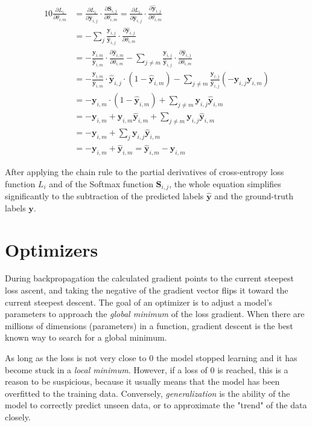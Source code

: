 \documentclass[a4paper]{report}
\newcommand{\matr}[1]{\mathbf{#1}}
\newcommand{\vect}[1]{\bm{#1}}
\newcommand{\yij}{\vect{y}_{i,j}}
\newcommand{\yhatij}{\vect{\hat{y}}_{i,j}}
\begin{document}
\begin{alignat*}{10}
    \frac{\partial L_i}{\partial \theta_{i,m}} &= \frac{\partial L_i}{\partial \yhatij} \cdot \frac{\partial \matr{S}_{i,j}}{\partial \theta_{i,m}} = \frac{\partial L_i}{\partial \yhatij} \cdot \frac{\partial \yhatij}{\partial \theta_{i,m}} \\
    &= -\sum_{j}\frac{\yij}{\yhatij} \cdot \frac{\partial \yhatij}{\partial \theta_{i,m}} \\
    &= -\frac{\vect{y}_{i,m}}{\vect{\hat{y}}_{i,m}} \cdot \frac{\partial \vect{\hat{y}}_{i,m}}{\partial \theta_{i,m}} - \sum_{j\not=m}\frac{\yij}{\yhatij} \cdot \frac{\partial\yhatij}{\partial\theta_{i,m}} \\
    &= -\frac{\vect{y}_{i,m}}{\vect{\hat{y}}_{i,m}} \cdot \yhatij \cdot (1 - \vect{\hat{y}}_{i,m}) - \sum_{j\not=m}\frac{\yij}{\yhatij}(-\yij\vect{y}_{i,m}) \\
    &= -\vect{y}_{i,m} \cdot (1 - \vect{\hat{y}}_{i,m}) + \sum_{j\not=m}\yij\vect{\hat{y}}_{i,m} \\
    &= -\vect{y}_{i,m} + \vect{y}_{i,m} \vect{\hat{y}}_{i,m} + \sum_{j\not=m}\yij\vect{\hat{y}}_{i,m} \\
    &= -\vect{y}_{i,m} + \sum_{j}\yij\vect{\hat{y}}_{i,m} \\
    &= -\vect{y}_{i,m} + \vect{\hat{y}}_{i,m} = \vect{\hat{y}}_{i,m} - \vect{y}_{i,m}
\end{alignat*}

After applying the chain rule to the partial derivatives of cross-entropy loss function $L_i$ and of the Softmax function $\matr{S}_{i,j}$, the whole equation simplifies significantly to the subtraction of the predicted labels $\vect{\hat{y}}$ and the ground-truth labels $\vect{y}$.

\section{Optimizers}
During backpropagation the calculated gradient points to the current steepest loss ascent, and taking the negative of the gradient vector flips it toward the current steepest descent. The goal of an optimizer is to adjust a model's parameters to approach the \emph{global minimum} of the loss gradient. When there are millions of dimensions (parameters) in a function, gradient descent is the best known way to search for a global minimum.

As long as the loss is not very close to 0 the model stopped learning and it has become stuck in a \emph{local minimum}. However, if a loss of 0 is reached, this is a reason to be suspicious, because it usually means that the model has been overfitted to the training data. Conversely, \emph{generalization} is the ability of the model to correctly predict unseen data, or to approximate the "trend" of the data closely.
\end{document}
